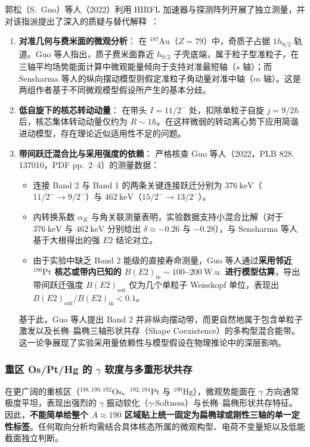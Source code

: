 郭松（S.~Guo）等人（2022）利用 HIRFL 加速器与探测阵列开展了独立测量，并对该指派提出了深入的质疑与替代解释~\cite{guo-2022-low-spin-wobbling-187au}：
\begin{enumerate}
\item \textbf{对准几何与费米面的微观分析}：
在 $^{187}\mathrm{Au}$（$Z=79$）中，奇质子占据 $1h_{9/2}$ 轨道。Guo 等人指出，质子费米面靠近 $h_{9/2}$ 子壳底端，属于粒子型准粒子，在三轴平均场势能面计算中微观能量倾向于支持对准最短轴（$s$ 轴）；而 Sensharma 等人的纵向摆动模型则假定准粒子角动量对准中轴（$m$ 轴）。这是两组作者基于不同微观模型假设所产生的基本分歧。
\item \textbf{低自旋下的核芯转动动量}：
在带头 $I = 11/2^-$ 处，扣除单粒子自旋 $j = 9/2\hbar$ 后，核芯集体转动动量仅约为 $R \sim 1\hbar$。在这样微弱的转动离心势下应用简谐进动模型，存在理论近似适用性不足的问题。
\item \textbf{带间跃迁混合比与采用强度的依赖}：
严格核查 Guo 等人（2022，PLB 828, 137010，PDF pp.~2--4）的测量数据：
\begin{itemize}
\item 连接 Band 2 与 Band 1 的两条关键连接跃迁分别为 $376\ \mathrm{keV}$（$11/2^- \to 9/2^-$）与 $462\ \mathrm{keV}$（$15/2^- \to 13/2^-$）。
\item 内转换系数 $\alpha_K$ 与角关联测量表明，实验数据支持小混合比解（对于 $376\ \mathrm{keV}$ 与 $462\ \mathrm{keV}$ 分别给出 $\delta \approx -0.26$ 与 $-0.28$），与 Sensharma 等人基于大根得出的强 $E2$ 结论对立。
\item 由于实验中缺乏 Band 2 能级的直接寿命测量，Guo 等人通过\textbf{采用邻近 $^{186}\mathrm{Pt}$ 核芯或带内已知的 $B(E2)_{\mathrm{in}} \sim 100$--$200\ \mathrm{W.u.}$ 进行模型估算}，导出带间跃迁强度 $B(E2)_{\mathrm{out}}$ 仅为几个单粒子 Weisskopf 单位，表现出 $B(E2)_{\mathrm{out}}/B(E2)_{\mathrm{in}} < 0.1$。
\end{itemize}
基于此，Guo 等人提出 Band 2 并非纵向摆动带，而更自然地属于包含单粒子激发以及长椭--扁椭三轴形状共存（Shape Coexistence）的多构型混合能带。这一论争展现了实验采用量依赖性与模型假设在物理推论中的深层影响。
\end{enumerate}

\subsubsection{重区 Os/Pt/Hg 的 $\gamma$ 软度与多重形状共存}

在更广阔的重核区（$^{188,190,192}\mathrm{Os}$、$^{192,194}\mathrm{Pt}$ 与 $^{190}\mathrm{Hg}$），微观势能面在 $\gamma$ 方向通常极度平坦，表现出强烈的 $\gamma$ 振动软化（$\gamma$-Softness）与长椭--扁椭形状共存特征。因此，\textbf{不能简单给整个 $A\approx 190$ 区域贴上统一固定为扁椭球或刚性三轴的单一定性标签}。任何取向分析均需结合具体核态所属的微观构型、电荷不变量矩以及低能截面独立判断。

